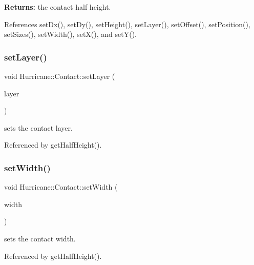 {\bfseries Returns\+:} the contact half height. 

References set\+Dx(), set\+Dy(), set\+Height(), set\+Layer(), set\+Offset(), set\+Position(), set\+Sizes(), set\+Width(), set\+X(), and set\+Y().

\mbox{\label{classHurricane_1_1Contact_a147644849f33bc4d58b6b997543c8306}} 
\subsubsection{\texorpdfstring{set\+Layer()}{setLayer()}}
{\footnotesize\ttfamily void Hurricane\+::\+Contact\+::set\+Layer (\begin{DoxyParamCaption}\item[{const \hyperlink{classHurricane_1_1Layer}{Layer} $\ast$}]{layer }\end{DoxyParamCaption})}

sets the contact layer. 

Referenced by get\+Half\+Height().

\mbox{\label{classHurricane_1_1Contact_aae6d5c96862fd6c834ff4abd61edc86f}} 
\subsubsection{\texorpdfstring{set\+Width()}{setWidth()}}
{\footnotesize\ttfamily void Hurricane\+::\+Contact\+::set\+Width (\begin{DoxyParamCaption}\item[{const \hyperlink{group__DbUGroup_ga4fbfa3e8c89347af76c9628ea06c4146}{Db\+U\+::\+Unit} \&}]{width }\end{DoxyParamCaption})}

sets the contact width. 

Referenced by get\+Half\+Height().

\mbox{\label{classHurricane_1_1Contact_a2fc2e7c85dc5495810544c48bb604712}} 
